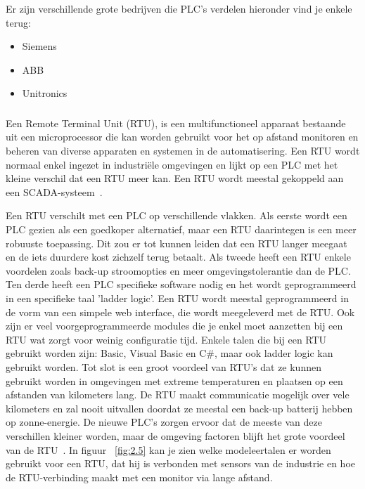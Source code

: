 Er zijn verschillende grote bedrijven die PLC's verdelen hieronder vind je enkele terug:
\begin{itemize}
    \item Siemens
    \item ABB
    \item Unitronics
\end{itemize}

\subsubsection{}
\label{subsubsec:RTU}
Een Remote Terminal Unit (RTU), is een multifunctioneel apparaat bestaande uit een microprocessor die kan worden gebruikt voor het op afstand monitoren en beheren van diverse apparaten en systemen in de automatisering. Een RTU wordt normaal enkel ingezet in industriële omgevingen en lijkt op een PLC met het kleine verschil dat een RTU meer kan. Een RTU wordt meestal gekoppeld aan een SCADA-systeem~\autocite{Realpars2018}. 

Een RTU verschilt met een PLC op verschillende vlakken. Als eerste wordt een PLC gezien als een goedkoper alternatief, maar een RTU daarintegen is een meer robuuste toepassing. Dit zou er tot kunnen leiden dat een RTU langer meegaat en de iets duurdere kost zichzelf terug betaalt. Als tweede heeft een RTU enkele voordelen zoals back-up stroomopties en meer omgevingstolerantie dan de PLC. Ten derde heeft een PLC specifieke software nodig en het wordt geprogrammeerd in een specifieke taal 'ladder logic'. Een RTU wordt meestal geprogrammeerd in de vorm van een simpele web interface, die wordt meegeleverd met de RTU. Ook zijn er veel voorgeprogrammeerde modules die je enkel moet aanzetten bij een RTU wat zorgt voor weinig configuratie tijd. Enkele talen die bij een RTU gebruikt worden zijn: Basic, Visual Basic en C\#, maar ook ladder logic kan gebruikt worden. Tot slot is een groot voordeel van RTU's dat ze kunnen gebruikt worden in omgevingen met extreme temperaturen en plaatsen op een afstanden van kilometers lang. De RTU maakt communicatie mogelijk over vele kilometers en zal nooit uitvallen doordat ze meestal een back-up batterij hebben op zonne-energie. De nieuwe PLC's zorgen ervoor dat de meeste van deze verschillen kleiner worden, maar de omgeving factoren blijft het grote voordeel van de RTU~\autocite{Realpars2018}. In figuur ~\ref{fig:2.5} kan je zien welke modeleertalen er worden gebruikt voor een RTU, dat hij is verbonden met sensors van de industrie en hoe de RTU-verbinding maakt met een monitor via lange afstand.

